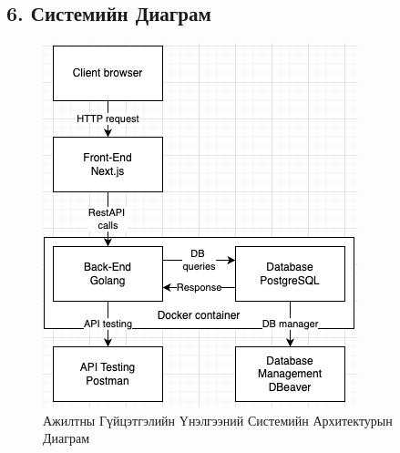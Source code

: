 \subsection*{6. Системийн Диаграм}
\begin{figure}
	\centering
	\includegraphics[]{src/images/image.png}
	\caption{Ажилтны Гүйцэтгэлийн Үнэлгээний Системийн Архитектурын Диаграм}
\end{figure}
\pagebreak
